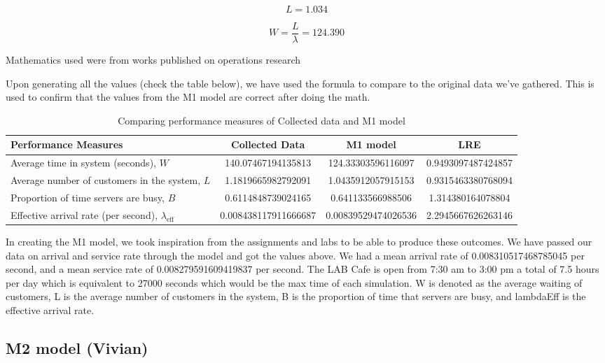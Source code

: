 \documentclass{article}
\begin{document}
$$
L = 1.034
$$

$$
W = \frac{L}{\lambda} = 124.390
$$

Mathematics used were from works published on operations research\cite{hillier1967introduction}\cite{little1961proof}

Upon generating all the values (check the table below), we have used the formula to compare to the original data we’ve gathered. This is used to confirm that the values from the M1 model are correct after doing the math.

\begin{table}[H]
    \centering
    \caption{Comparing performance measures of Collected data and M1 model}
    \begin{tabu}{X S S S}
        \toprule
        \textbf{Performance Measures} & \textbf{Collected Data} & \textbf{M1 model}& \textbf{LRE}\\
        \midrule
        Average time in system (seconds), $W$ & 140.07467194135813 & 124.33303596116097 & 0.9493097487424857\\
        Average number of customers in the system, $L$ & 1.1819665982792091 & 1.0435912057915153 & 0.9315463380768094\\
        Proportion of time servers are busy, $B$ & 0.6114848739024165 & 0.641133566988506 & 1.314380164078804\\
        Effective arrival rate (per second), $\lambda_{\text{eff}}$ & 0.008438117911666687 & 0.00839529474026536 & 2.2945667626263146\\
        \bottomrule
    \end{tabu}
    \label{tab:M1}
\end{table}

In creating the M1 model, we took inspiration from the assignments and labs to be able to produce these outcomes. We have passed our data on arrival and service rate through the model and got the values above.
We had a mean arrival rate of 0.008310517468785045 per second, and a mean service rate of 0.008279591609419837 per second. The LAB Cafe is open from 7:30 am to 3:00 pm a total of 7.5 hours per day which is equivalent to 27000 seconds which would be the max time of each simulation. 
W is denoted as the average waiting of customers, L is the average number of customers in the system, B is the proportion of time that servers are busy, and lambdaEff is the effective arrival rate.

\subsection{M2 model (Vivian)}
\end{document}
